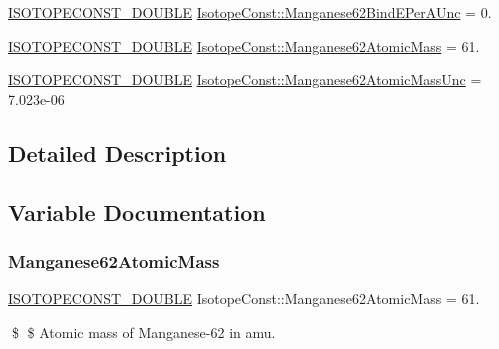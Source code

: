\begin{DoxyCompactItemize}
\mbox{\hyperlink{group___isotope_const-_macros_ga8f45a7272ce02c0b4c65c44636ed719a}{I\+S\+O\+T\+O\+P\+E\+C\+O\+N\+S\+T\+\_\+\+D\+O\+U\+B\+LE}} \mbox{\hyperlink{group___isotope_const-_manganese-_mn62_ga642d896c879f8731a903fdae20f290c9}{Isotope\+Const\+::\+Manganese62\+Bind\+E\+Per\+A\+Unc}} = 0.
\item 
\mbox{\hyperlink{group___isotope_const-_macros_ga8f45a7272ce02c0b4c65c44636ed719a}{I\+S\+O\+T\+O\+P\+E\+C\+O\+N\+S\+T\+\_\+\+D\+O\+U\+B\+LE}} \mbox{\hyperlink{group___isotope_const-_manganese-_mn62_ga7cb990be1e2989b83e92142eeaa9ddd8}{Isotope\+Const\+::\+Manganese62\+Atomic\+Mass}} = 61.
\item 
\mbox{\hyperlink{group___isotope_const-_macros_ga8f45a7272ce02c0b4c65c44636ed719a}{I\+S\+O\+T\+O\+P\+E\+C\+O\+N\+S\+T\+\_\+\+D\+O\+U\+B\+LE}} \mbox{\hyperlink{group___isotope_const-_manganese-_mn62_ga267fd5674d31f2035fd72f57176869d0}{Isotope\+Const\+::\+Manganese62\+Atomic\+Mass\+Unc}} = 7.\+023e-\/06
\end{DoxyCompactItemize}


\subsection{Detailed Description}


\subsection{Variable Documentation}
\mbox{\label{group___isotope_const-_manganese-_mn62_ga7cb990be1e2989b83e92142eeaa9ddd8}} 
\subsubsection{\texorpdfstring{Manganese62\+Atomic\+Mass}{Manganese62AtomicMass}}
{\footnotesize\ttfamily \mbox{\hyperlink{group___isotope_const-_macros_ga8f45a7272ce02c0b4c65c44636ed719a}{I\+S\+O\+T\+O\+P\+E\+C\+O\+N\+S\+T\+\_\+\+D\+O\+U\+B\+LE}} Isotope\+Const\+::\+Manganese62\+Atomic\+Mass = 61.}

\$ \$ Atomic mass of Manganese-\/62 in amu. \mbox{\label{group___isotope_const-_manganese-_mn62_ga267fd5674d31f2035fd72f57176869d0}} 
